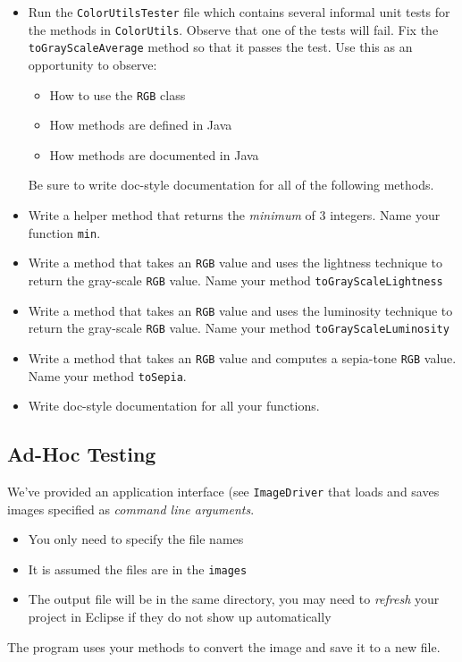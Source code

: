 \documentclass[12pt]{scrartcl}
\begin{document}
\begin{itemize}

  \item Run the \texttt{ColorUtilsTester} file which 
  contains several informal unit tests for the methods in 
  \texttt{ColorUtils}.  Observe that one of the tests
  will fail.  Fix the \texttt{toGrayScaleAverage} method so 
  that it passes the test.  Use this as an opportunity to observe:
  \begin{itemize}
    \item How to use the \texttt{RGB} class 
    \item How methods are defined in Java
    \item How methods are documented in Java
  \end{itemize}
  
  Be sure to write doc-style documentation for all of
  the following methods.
  
  \item Write a helper method that returns the \emph{minimum}
  of 3 integers.  Name your function \texttt{min}.

  \item Write a method that takes an \texttt{RGB} value and
  uses the lightness technique to return the gray-scale 
  \texttt{RGB} value.  
  Name your method \texttt{toGrayScaleLightness}

  \item Write a method that takes an \texttt{RGB} value and
  uses the luminosity technique to return the gray-scale 
  \texttt{RGB} value.  
  Name your method \texttt{toGrayScaleLuminosity}

  \item Write a method that takes an \texttt{RGB} value and
  computes a sepia-tone \texttt{RGB} value.
  Name your method \texttt{toSepia}.
  
  \item Write doc-style documentation for all your functions.
\end{itemize}

\subsection{Ad-Hoc Testing}

We've provided an application interface (see \texttt{ImageDriver}
that loads and saves images specified as \emph{command line arguments}.
\begin{itemize}
  \item You only need to specify the file names
  \item It is assumed the files are in the \texttt{images}
  \item The output file will be in the same directory, you may need to
  \emph{refresh} your project in Eclipse if they do not show up automatically
\end{itemize}
The program uses your methods to convert the image and save it to a new file.
\end{document}

